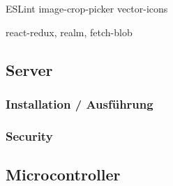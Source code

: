 ESLint
image-crop-picker
vector-icons


react-redux, realm, fetch-blob
\subsection{Server}
    
    \subsubsection{Installation / Ausführung}
    \subsubsection{Security}

\subsection{Microcontroller}
    
    